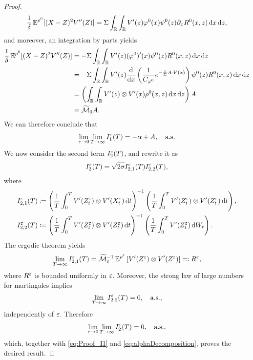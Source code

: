 \documentclass[10pt]{article}
\begin{document}
\begin{proof}
\begin{equation}\label{eq:final_result}
	\frac{1}{\delta} \operatorname{\mathbb{E}}^{\rho^0}[(X - Z)^2 V''(Z)] = \Sigma \int_{\mathbb{R}} \int_{\mathbb{R}} V'(z) \varphi^0(x) \psi^0(z) \partial_x R^0(x,z) \,\mathrm{d} x \,\mathrm{d} z,
\end{equation}
and moreover, an integration by parts yields
\begin{equation}
\begin{aligned}
	\frac{1}{\delta} \operatorname{\mathbb{E}}^{\rho^0}[(X - Z)^2 V''(Z)] &= -\Sigma \int_{\mathbb{R}} \int_{\mathbb{R}} V'(z) (\varphi^0)'(x) \psi^0(z) R^0(x,z) \,\mathrm{d} x \,\mathrm{d} z\\
	&= -\Sigma \int_{\mathbb{R}} \int_{\mathbb{R}} V'(z) \frac{\mathrm{d}}{\mathrm{d} x} \left ( \frac{1}{C_{\varphi^0}} e^{-\frac{1}{\Sigma} A\cdot V(x)} \right ) \psi^0(z) R^0(x,z) \,\mathrm{d} x \,\mathrm{d} z \\
	&= \left(\int_{\mathbb{R}} \int_{\mathbb{R}} V'(z) \otimes V'(x) \rho^0(x,z) \,\mathrm{d} x \,\mathrm{d} z\right)A\\
	&=  \widetilde {\mathcal M}_0 A.
\end{aligned}
\end{equation}
We can therefore conclude that
\begin{equation}\label{eq:Proof_I1}
\lim_{\varepsilon \to 0} \lim_{T \to \infty} I_1^\varepsilon(T) = -\alpha + A, \quad \text{a.s.}
\end{equation}
We now consider the second term $I_2^\varepsilon(T)$, and rewrite it as
\begin{equation}
	I^\varepsilon_2(T) = \sqrt{2\sigma} I_{2,1}^\varepsilon(T)  I_{2,2}^\varepsilon(T),
\end{equation}
where
\begin{equation}
\begin{aligned}
	I_{2,1}^\varepsilon(T) &\coloneqq \left(\frac{1}{T} \int_0^T V'(Z^\varepsilon_t) \otimes V'(X^\varepsilon_t) \,\mathrm{d} t\right)^{-1}\left(\frac{1}{T} \int_0^T V'(Z^\varepsilon_t) \otimes V'(Z^\varepsilon_t) \,\mathrm{d} t\right),\\
	I_{2,2}^\varepsilon(T) &\coloneqq \left(\frac{1}{T} \int_0^T V'(Z^\varepsilon_t) \otimes V'(Z^\varepsilon_t) \,\mathrm{d} t\right)^{-1} \left(\frac1T \int_0^T V'(Z^\varepsilon_t) \,\mathrm{d} W_t\right).
\end{aligned}
\end{equation}
The ergodic theorem yields
\begin{equation}
	\lim_{T \to \infty} I_{2,1}^\varepsilon(T) = \widetilde {\mathcal M}_\varepsilon^{-1}\operatorname{\mathbb{E}}^{\rho^\varepsilon}\left[V'(Z^\varepsilon) \otimes V'(Z^\varepsilon)\right] \eqqcolon R^\varepsilon,
\end{equation}
where $R^\varepsilon$ is bounded uniformly in $\varepsilon$. Moreover, the strong law of large numbers for martingales implies
\begin{equation}
	\lim_{T \to \infty} I_{2,2}^\varepsilon(T) = 0, \quad \text{a.s.},
\end{equation}
independently of $\varepsilon$. Therefore
\begin{equation}
	\lim_{\varepsilon \to 0}\lim_{T \to \infty} I_2^\varepsilon(T) = 0, \quad \text{a.s.},
\end{equation}
which, together with \eqref{eq:Proof_I1} and \eqref{eq:alphaDecomposition}, proves the desired result.
\end{proof}
\end{document}
